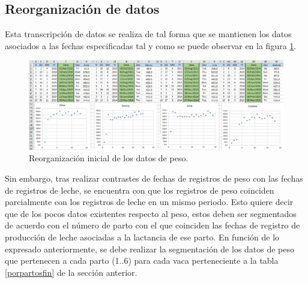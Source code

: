 \subsection{Reorganización de datos}\label{pocospesos}
Esta transcripción de datos se realiza de tal forma que se mantienen los datos asociados a las fechas especificadas tal y como se puede observar en la figura \ref{dfpesopng}.
\begin{figure}[H]
	 \begin{center}
	 \includegraphics[scale=0.5]{img/dfinicialpeso.jpg}
	 \end{center}
	 \caption{Reorganización inicial de los datos de peso.  \label{dfpesopng}}
\end{figure}

Sin embargo, tras realizar contrastes de fechas de registros de peso con las fechas de registros de leche, se encuentra con que los registros de peso coinciden parcialmente con los registros de leche en un mismo periodo. Esto quiere decir que de los pocos datos existentes respecto al peso, estos deben ser segmentados de acuerdo con el número de parto con el que coinciden las fechas de registro de producción de leche asociadas a la lactancia de ese parto. En función de lo expresado anteriormente, se debe realizar la segmentación de los datos de peso que pertenecen a cada parto (1..6) para cada vaca perteneciente a la tabla \ref{porpartosfin} de la sección anterior.\\


